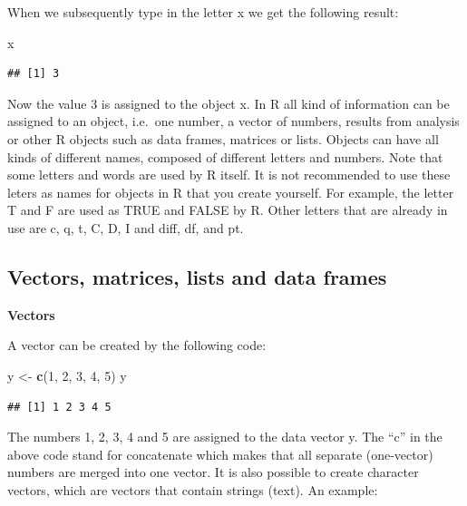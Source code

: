 \documentclass[
]{book}
\newenvironment{Shaded}{\begin{snugshade}}{\end{snugshade}}
\newcommand{\DecValTok}[1]{\textcolor[rgb]{0.00,0.00,0.81}{#1}}
\newcommand{\KeywordTok}[1]{\textcolor[rgb]{0.13,0.29,0.53}{\textbf{#1}}}
\newcommand{\NormalTok}[1]{#1}
\newcommand{\StringTok}[1]{\textcolor[rgb]{0.31,0.60,0.02}{#1}}
\begin{document}
When we subsequently type in the letter x we get the following result:

\begin{Shaded}
\begin{Highlighting}[]
\NormalTok{x }
\end{Highlighting}
\end{Shaded}

\begin{verbatim}
## [1] 3
\end{verbatim}

Now the value 3 is assigned to the object x. In R all kind of information can be assigned to an object, i.e.~one number, a vector of numbers, results from analysis or other R objects such as data frames, matrices or lists. Objects can have all kinds of different names, composed of different letters and numbers. Note that some letters and words are used by R itself. It is not recommended to use these leters as names for objects in R that you create yourself. For example, the letter T and F are used as TRUE and FALSE by R. Other letters that are already in use are c, q, t, C, D, I and diff, df, and pt.

\hypertarget{vectors-matrices-lists-and-data-frames}{%
\subsection{Vectors, matrices, lists and data frames}\label{vectors-matrices-lists-and-data-frames}}

\textbf{Vectors}

A vector can be created by the following code:

\begin{Shaded}
\begin{Highlighting}[]
\NormalTok{y <-}\StringTok{ }\KeywordTok{c}\NormalTok{(}\DecValTok{1}\NormalTok{, }\DecValTok{2}\NormalTok{, }\DecValTok{3}\NormalTok{, }\DecValTok{4}\NormalTok{, }\DecValTok{5}\NormalTok{)}
\NormalTok{y}
\end{Highlighting}
\end{Shaded}

\begin{verbatim}
## [1] 1 2 3 4 5
\end{verbatim}

The numbers 1, 2, 3, 4 and 5 are assigned to the data vector y. The ``c'' in the above code stand for concatenate which makes that all separate (one-vector) numbers are merged into one vector. It is also possible to create character vectors, which are vectors that contain strings (text). An example:
\end{document}

